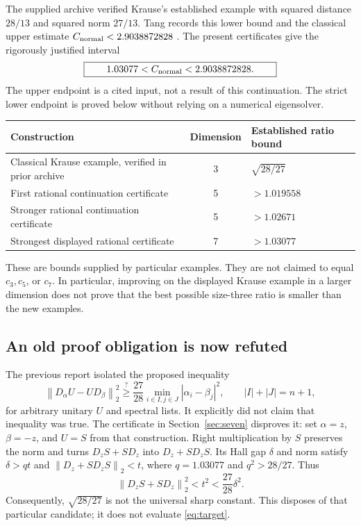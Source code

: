 \documentclass[11pt,letterpaper]{article}
\theoremstyle{remark}\newtheorem{remark}[theorem]{Remark}
\newcommand{\norm}[1]{\left\lVert#1\right\rVert_2}\newcommand{\abs}[1]{\left|#1\right|}\newcommand{\diag}{\operatorname{diag}}\newcommand{\rank}{\operatorname{rank}}
\begin{document}
The supplied archive verified Krause's established example with squared distance $28/13$ and squared norm $27/13$. Tang records this lower bound and the classical upper estimate $C_{\mathrm{normal}}<2.9038872828$ \cite{Tang}. The present certificates give the rigorously justified interval
\begin{equation}\label{eq:interval}
\boxed{\qquad 1.03077<C_{\mathrm{normal}}<2.9038872828.\qquad}
\end{equation}
The upper endpoint is a cited input, not a result of this continuation. The strict lower endpoint is proved below without relying on a numerical eigensolver.

\begin{center}
\begin{tabular}{@{}lcl@{}}\toprule
Construction & Dimension & Established ratio bound\\\midrule
Classical Krause example, verified in prior archive & 3 & $\sqrt{28/27}$\\
First rational continuation certificate & 5 & $>1.019558$\\
Stronger rational continuation certificate & 5 & $>1.02671$\\
Strongest displayed rational certificate & 7 & $>1.03077$\\\bottomrule
\end{tabular}
\end{center}
These are bounds supplied by particular examples. They are not claimed to equal $c_3,c_5$, or $c_7$. In particular, improving on the displayed Krause example in a larger dimension does not prove that the best possible size-three ratio is smaller than the new examples.

\subsection{An old proof obligation is now refuted}
The previous report isolated the proposed inequality
\begin{equation}\label{eq:oldcandidate}
\norm{D_\alpha U-UD_\beta}^{2}
\stackrel{?}{\ge}\frac{27}{28}
\min_{i\in I,j\in J}\abs{\alpha_i-\beta_j}^{2},
\qquad |I|+|J|=n+1,
\end{equation}
for arbitrary unitary $U$ and spectral lists. It explicitly did not claim that inequality was true. The certificate in Section~\ref{sec:seven} disproves it: set $\alpha=z$, $\beta=-z$, and $U=S$ from that construction. Right multiplication by $S$ preserves the norm and turns $D_zS+SD_z$ into $D_z+SD_zS$. Its Hall gap $\delta$ and norm satisfy $\delta>q t$ and $\norm{D_z+SD_zS}<t$, where $q=1.03077$ and $q^2>28/27$. Thus
\[
\norm{D_zS+SD_z}^2<t^2<\frac{27}{28}\delta^2.
\]
Consequently, $\sqrt{28/27}$ is not the universal sharp constant. This disposes of that particular candidate; it does not evaluate \eqref{eq:target}.
\end{document}
